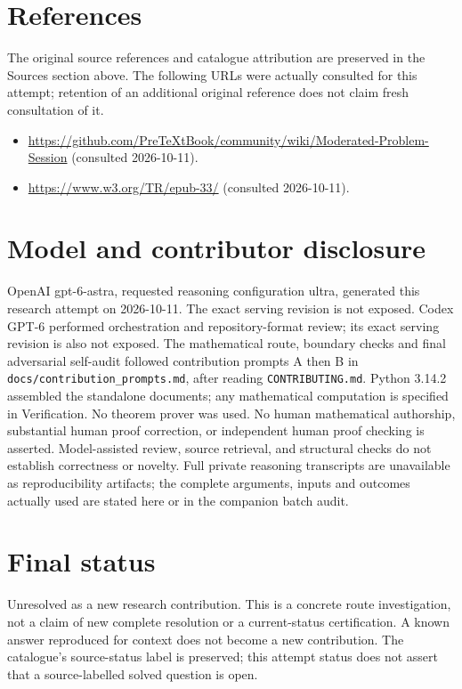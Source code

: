 \documentclass[11pt]{article}
\begin{document}
\section{References}
The original source references and catalogue attribution are preserved in the
Sources section above. The following URLs were actually consulted for this attempt;
retention of an additional original reference does not claim fresh consultation of it.
\begin{itemize}
\item \url{https://github.com/PreTeXtBook/community/wiki/Moderated-Problem-Session} (consulted 2026-10-11). 
\item \url{https://www.w3.org/TR/epub-33/} (consulted 2026-10-11). 
\end{itemize}
\section{Model and contributor disclosure}
OpenAI gpt-6-astra, requested reasoning configuration ultra, generated this research
attempt on 2026-10-11. The exact serving revision is not exposed. Codex GPT-6
performed orchestration and repository-format review; its exact serving revision
is also not exposed. The mathematical route, boundary checks and final adversarial
self-audit followed contribution prompts A then B in
\texttt{docs/contribution\_prompts.md}, after reading \texttt{CONTRIBUTING.md}.
Python 3.14.2 assembled the standalone documents; any mathematical computation is
specified in Verification. No theorem prover was used. No human mathematical
authorship, substantial human proof correction, or independent human proof checking
is asserted. Model-assisted review, source retrieval, and structural checks do not
establish correctness or novelty. Full private reasoning transcripts are unavailable
as reproducibility artifacts; the complete arguments, inputs and outcomes actually
used are stated here or in the companion batch audit.
\section{Final status}
Unresolved as a new research contribution. This is a concrete route investigation,
not a claim of new complete resolution or a current-status certification. A known
answer reproduced for context does not become a new contribution. The catalogue's
source-status label is preserved; this attempt status does not assert that a
source-labelled solved question is open.
\end{document}
